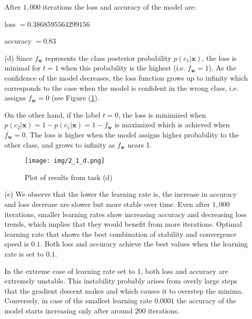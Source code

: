 \documentclass [a4paper, 11pt] {article}
\renewcommand{\v}[1]{\boldsymbol{#1}}
\begin{document}
\begin{enumerate}
\bigskip
\bigskip
\bigskip

After $1,000$ iterations the loss and accuracy of the model are:

	\qquad loss $= 0.3868595564299156$
	
	\qquad accuracy $= 0.83$



	
\item[(d)]
Since $f_{\v{w}}$ represents the class posterior probability $p(c_1|\v{x})$, the loss is minimal for $t = 1$ when this probability is the highest (i.e. $f_{\v{w}} = 1$). As the confidence of the model decreases, the loss function grows up to infinity which corresponds to the case when the model is confident in the wrong class, i.e. assigns $f_{\v{w}} = 0$ (see Figure (\ref{fig:1}).  

On the other hand, if the label $t = 0$, the loss is minimized when $p(c_2|\v{x}) = 1 - p(c_1|\v{x}) = 1 - f_{\v{w}}$ is maximized which is achieved when $f_{\v{w}} = 0$. The loss is higher when the model assigns higher probability to the other class, and grows to infinity as $f_{\v{w}}$ nears 1. 

\begin{figure}[!h]
	\centering
	\texttt{[image: img/2\_1\_d.png]}
	\caption{Plot of results from task (d)}
	\label{fig:1}
\end{figure}

\item[(e)]
We observe that the lower the learning rate is, the increase in accuracy and loss decrease are slower but more stable over time. Even after $1,000$ iterations, smaller learning rates show increasing accuracy and decreasing loss trends, which implies that they would benefit from more iterations. Optimal learning rate that shows the best combination of stability and convergence speed is $0.1$. Both loss and accuracy achieve the best values when the learning rate is set to $0.1$.  

In the extreme case of learning rate set to 1, both loss and accuracy are extremely unstable. This instability probably arises from overly large steps that the gradient descent makes and which causes it to overstep the minima. Conversely, in case of the smallest learning rate $0.0001$ the accuracy of the model starts increasing only after around $200$ iterations.


\end{enumerate}
\end{document}
